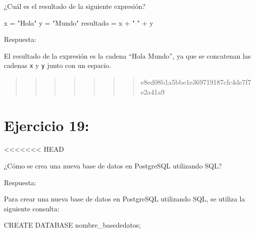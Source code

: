 \documentclass[
  a4paper,
  onepage,
  openany]{scrreprt}
\newenvironment{Shaded}{\begin{snugshade}}{\end{snugshade}}
\newcommand{\KeywordTok}[1]{\textcolor[rgb]{0.00,0.23,0.31}{#1}}
\newcommand{\NormalTok}[1]{\textcolor[rgb]{0.00,0.23,0.31}{#1}}
\newcommand{\OperatorTok}[1]{\textcolor[rgb]{0.37,0.37,0.37}{#1}}
\newcommand{\StringTok}[1]{\textcolor[rgb]{0.13,0.47,0.30}{#1}}
\begin{document}
¿Cuál es el resultado de la siguiente expresión?

\begin{Shaded}
\begin{Highlighting}[]
\NormalTok{x }\OperatorTok{=} \StringTok{"Hola"}
\NormalTok{y }\OperatorTok{=} \StringTok{"Mundo"}
\NormalTok{resultado }\OperatorTok{=}\NormalTok{ x }\OperatorTok{+} \StringTok{" "} \OperatorTok{+}\NormalTok{ y}
\end{Highlighting}
\end{Shaded}

Respuesta:

El resultado de la expresión es la cadena ``Hola Mundo'', ya que se
concatenan las cadenas \texttt{x} y \texttt{y} junto con un espacio.

\begin{quote}
\begin{quote}
\begin{quote}
\begin{quote}
\begin{quote}
\begin{quote}
\begin{quote}
e8ed08b1a5bbe1e369719187cfc4de7f7e2a41a9
\end{quote}
\end{quote}
\end{quote}
\end{quote}
\end{quote}
\end{quote}
\end{quote}

\hypertarget{ejercicio-19}{%
\chapter{Ejercicio 19:}\label{ejercicio-19}}

\textless\textless\textless\textless\textless\textless\textless{} HEAD

¿Cómo se crea una nueva base de datos en PostgreSQL utilizando SQL?

Respuesta:

Para crear una nueva base de datos en PostgreSQL utilizando SQL, se
utiliza la siguiente consulta:

\begin{Shaded}
\begin{Highlighting}[]
\KeywordTok{CREATE} \KeywordTok{DATABASE}\NormalTok{ nombre\_basededatos;}
\end{Highlighting}
\end{Shaded}
\end{document}
